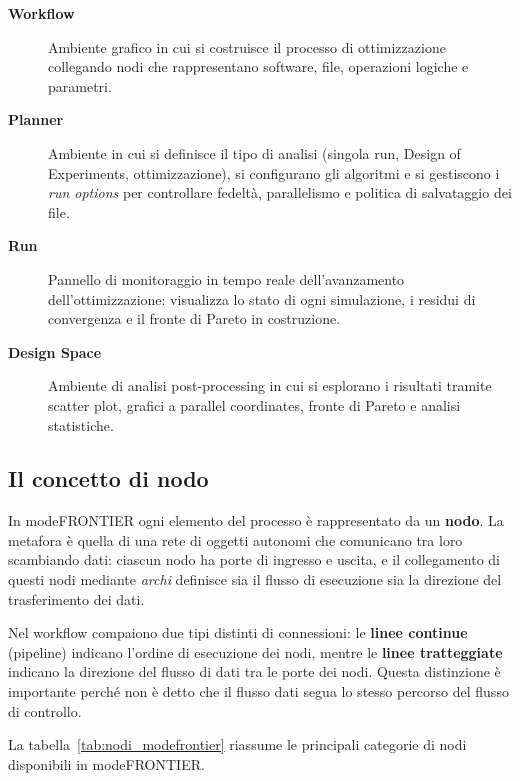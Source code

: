 \begin{description}
    \item[\textbf{Workflow}] Ambiente grafico in cui si costruisce il
    processo di ottimizzazione collegando nodi che rappresentano software,
    file, operazioni logiche e parametri.
    \item[\textbf{Planner}] Ambiente in cui si definisce il tipo di
    analisi (singola run, Design of Experiments, ottimizzazione),
    si configurano gli algoritmi e si gestiscono i \textit{run options}
    per controllare fedeltà, parallelismo e politica di salvataggio dei file.
    \item[\textbf{Run}] Pannello di monitoraggio in tempo reale
    dell'avanzamento dell'ottimizzazione: visualizza lo stato di ogni
    simulazione, i residui di convergenza e il fronte di Pareto in
    costruzione.
    \item[\textbf{Design Space}] Ambiente di analisi post-processing in cui
    si esplorano i risultati tramite scatter plot, grafici a parallel
    coordinates, fronte di Pareto e analisi statistiche.
\end{description}

\subsection{Il concetto di nodo}

In modeFRONTIER ogni elemento del processo è rappresentato da un
\textbf{nodo}. La metafora è quella di una rete di oggetti autonomi
che comunicano tra loro scambiando dati: ciascun nodo ha porte di
ingresso e uscita, e il collegamento di questi nodi mediante
\textit{archi} definisce sia il flusso di esecuzione sia la direzione
del trasferimento dei dati.

Nel workflow compaiono due tipi distinti di connessioni:
le \textbf{linee continue} (pipeline) indicano l'ordine di esecuzione
dei nodi, mentre le \textbf{linee tratteggiate} indicano la direzione
del flusso di dati tra le porte dei nodi.
Questa distinzione è importante perché non è detto che il flusso dati
segua lo stesso percorso del flusso di controllo.

La tabella~\ref{tab:nodi_modefrontier} riassume le principali categorie
di nodi disponibili in modeFRONTIER.


